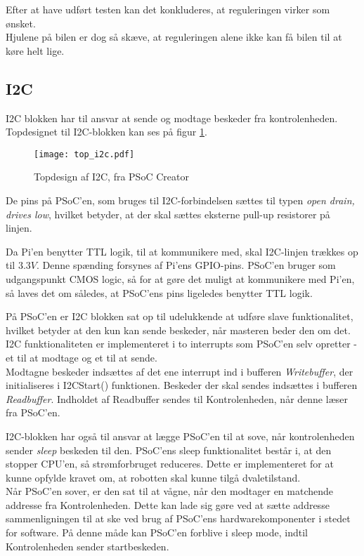 Efter at have udført testen kan det konkluderes, at reguleringen virker som ønsket.
\\Hjulene på bilen er dog så skæve, at reguleringen alene ikke kan få bilen til at køre helt lige.


\subsection{I2C}
I2C blokken har til ansvar at sende og modtage beskeder fra kontrolenheden. Topdesignet til I2C-blokken kan ses på figur \ref{fig:top_i2c}.
\begin{figure}[H]  %
\centering
\texttt{[image: top\_i2c.pdf]}
\caption{Topdesign af I2C, fra PSoC Creator}
\label{fig:top_i2c}
\end{figure}
De pins på PSoC'en, som bruges til I2C-forbindelsen sættes til typen \textit{open drain, drives low}, hvilket betyder, at der skal sættes eksterne pull-up resistorer på linjen. 

Da Pi'en benytter TTL logik, til at kommunikere med, skal I2C-linjen trækkes op til $3.3 V$. 
Denne spænding forsynes af Pi'ens GPIO-pins. 
PSoC'en bruger som udgangspunkt CMOS logic, så for at gøre det muligt at kommunikere med Pi'en, så laves det om således, at PSoC'ens pins ligeledes benytter TTL logik.

På PSoC'en er I2C blokken sat op til udelukkende at udføre slave funktionalitet, hvilket betyder at den kun kan sende beskeder, når masteren beder den om det. 
I2C funktionaliteten er implementeret i to interrupts som PSoC'en selv opretter - et til at modtage og et til at sende.\\
Modtagne beskeder indsættes af det ene interrupt ind i bufferen \textit{Writebuffer}, der initialiseres i I2CStart() funktionen. 
Beskeder der skal sendes indsættes i bufferen \textit{Readbuffer}.
Indholdet af Readbuffer sendes til Kontrolenheden, når denne læser fra PSoC'en.

I2C-blokken har også til ansvar at lægge PSoC'en til at sove, når kontrolenheden sender \textit{sleep} beskeden til den. 
PSoC'ens sleep funktionalitet består i, at den stopper CPU'en, så strømforbruget reduceres. 
Dette er implementeret for at kunne opfylde kravet om, at robotten skal kunne tilgå dvaletilstand. \\
Når PSoC'en sover, er den sat til at vågne, når den modtager en matchende addresse fra Kontrolenheden. 
Dette kan lade sig gøre ved at sætte addresse sammenligningen til at ske ved brug af PSoC'ens hardwarekomponenter i stedet for software. 
På denne måde kan PSoC'en forblive i sleep mode, indtil Kontrolenheden sender startbeskeden.

